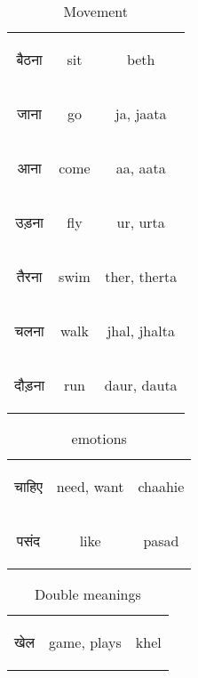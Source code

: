 \begin{table}[H]
    \centering
    \begin{tabular}{c|c|c}
     \begin{hindi} बैठना  \end{hindi} & sit & beth \\
     \begin{hindi} जाना \end{hindi} & go & ja, jaata \\
     \begin{hindi} आना \end{hindi} & come & aa, aata \\
     \begin{hindi} उड़ना \end{hindi} & fly & ur, urta \\
     \begin{hindi} तैरना \end{hindi} & swim & ther, therta \\
     \begin{hindi} चलना \end{hindi} & walk & jhal, jhalta \\
     \begin{hindi} दौड़ना \end{hindi} & run & daur, dauta \\
    \end{tabular}
    \caption{Movement}
    \label{tab:verbs_move}
\end{table}



\begin{table}[H]
    \centering
    \begin{tabular}{c|c|c}
        \begin{hindi}चाहिए \end{hindi} & need, want & chaahie\\
        \begin{hindi}पसंद  \end{hindi} & like & pasad\\
    \end{tabular}
    \caption{emotions}
    \label{tab:verb_emotions}
\end{table}

\begin{table}[H]
    \centering
    \begin{tabular}{c|c|c}
        \begin{hindi} खेल \end{hindi} & game, plays & khel \\
    \end{tabular}
    \caption{Double meanings}
    \label{tab:doublemeanings}
\end{table}


